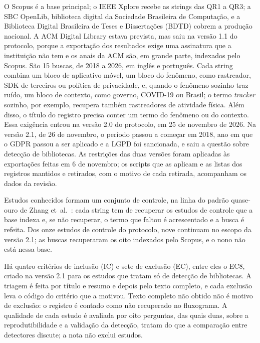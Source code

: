 O Scopus é a base principal; o IEEE Xplore recebe as strings das QR1 a QR3; a SBC OpenLib, biblioteca digital da Sociedade Brasileira de Computação, e a Biblioteca Digital Brasileira de Teses e Dissertações (BDTD) cobrem a produção nacional. A ACM Digital Library estava prevista, mas saiu na versão 1.1 do protocolo, porque a exportação dos resultados exige uma assinatura que a instituição não tem e os anais da ACM são, em grande parte, indexados pelo Scopus. São 15 buscas, de 2018 a 2026, em inglês e português. Cada string combina um bloco de aplicativo móvel, um bloco do fenômeno, como rastreador, SDK de terceiros ou política de privacidade, e, quando o fenômeno sozinho traz ruído, um bloco de contexto, como governo, COVID-19 ou Brasil; o termo \emph{tracker} sozinho, por exemplo, recupera também rastreadores de atividade física. Além disso, o título do registro precisa conter um termo do fenômeno ou do contexto. Essa exigência entrou na versão 2.0 do protocolo, em 25 de novembro de 2026. Na versão 2.1, de 26 de novembro, o período passou a começar em 2018, ano em que o GDPR passou a ser aplicado e a LGPD foi sancionada, e saiu a questão sobre detecção de bibliotecas. As restrições das duas versões foram aplicadas às exportações feitas em 6 de novembro; os scripts que as aplicam e as listas dos registros mantidos e retirados, com o motivo de cada retirada, acompanham os dados da revisão.

Estudos conhecidos formam um conjunto de controle, na linha do padrão quase-ouro de Zhang et~al.~\cite{zhang2011}: cada string tem de recuperar os estudos de controle que a base indexa e, se não recuperar, o termo que faltou é acrescentado e a busca é refeita. Dos onze estudos de controle do protocolo, nove continuam no escopo da versão 2.1; as buscas recuperaram os oito indexados pelo Scopus, e o nono não está nessa base.

Há quatro critérios de inclusão (IC) e sete de exclusão (EC), entre eles o EC8, criado na versão 2.1 para os estudos que tratam só de detecção de bibliotecas. A triagem é feita por título e resumo e depois pelo texto completo, e cada exclusão leva o código do critério que a motivou. Texto completo não obtido não é motivo de exclusão: o registro é contado como não recuperado no fluxograma. A qualidade de cada estudo é avaliada por oito perguntas, das quais duas, sobre a reprodutibilidade e a validação da detecção, tratam do que a comparação entre detectores discute; a nota não exclui estudos.

